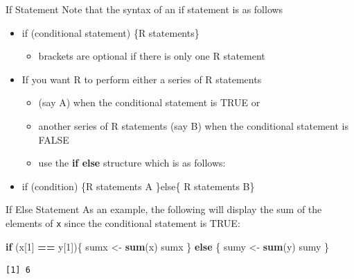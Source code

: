 \documentclass[
  ignorenonframetext,
]{beamer}
\newenvironment{Shaded}{\begin{snugshade}}{\end{snugshade}}
\newcommand{\ControlFlowTok}[1]{\textcolor[rgb]{0.13,0.29,0.53}{\textbf{#1}}}
\newcommand{\DecValTok}[1]{\textcolor[rgb]{0.00,0.00,0.81}{#1}}
\newcommand{\FunctionTok}[1]{\textcolor[rgb]{0.13,0.29,0.53}{\textbf{#1}}}
\newcommand{\NormalTok}[1]{#1}
\newcommand{\OtherTok}[1]{\textcolor[rgb]{0.56,0.35,0.01}{#1}}
\newcommand{\SpecialCharTok}[1]{\textcolor[rgb]{0.81,0.36,0.00}{\textbf{#1}}}
\providecommand{\tightlist}{%
  \setlength{\itemsep}{0pt}\setlength{\parskip}{0pt}}
\begin{document}
\begin{frame}{If Statement}
\protect\hypertarget{if-statement-1}{}
Note that the syntax of an if statement is as follows

\begin{itemize}
\item
  if (conditional statement) \{R statements\}

  \begin{itemize}
  \tightlist
  \item
    brackets are optional if there is only one R statement
  \end{itemize}
\item
  If you want R to perform either a series of R statements

  \begin{itemize}
  \tightlist
  \item
    (say A) when the conditional statement is TRUE or
  \item
    another series of R statements (say B) when the conditional
    statement is FALSE
  \item
    use the \textbf{if else} structure which is as follows:
  \end{itemize}
\item
  if (condition) \{R statements A \}else\{ R statements B\}
\end{itemize}
\end{frame}

\begin{frame}[fragile]{If Else Statement}
\protect\hypertarget{if-else-statement}{}
As an example, the following will display the sum of the elements of
\texttt{x} since the conditional statement is TRUE:

\small

\begin{Shaded}
\begin{Highlighting}[]
\ControlFlowTok{if}\NormalTok{ (x[}\DecValTok{1}\NormalTok{] }\SpecialCharTok{==}\NormalTok{ y[}\DecValTok{1}\NormalTok{])\{}
\NormalTok{  sumx }\OtherTok{\textless{}{-}} \FunctionTok{sum}\NormalTok{(x)}
\NormalTok{  sumx}
\NormalTok{\} }\ControlFlowTok{else}\NormalTok{ \{}
\NormalTok{  sumy }\OtherTok{\textless{}{-}} \FunctionTok{sum}\NormalTok{(y)}
\NormalTok{  sumy}
\NormalTok{\}}
\end{Highlighting}
\end{Shaded}

\begin{verbatim}
[1] 6
\end{verbatim}

\normalsize
\end{frame}
\end{document}
